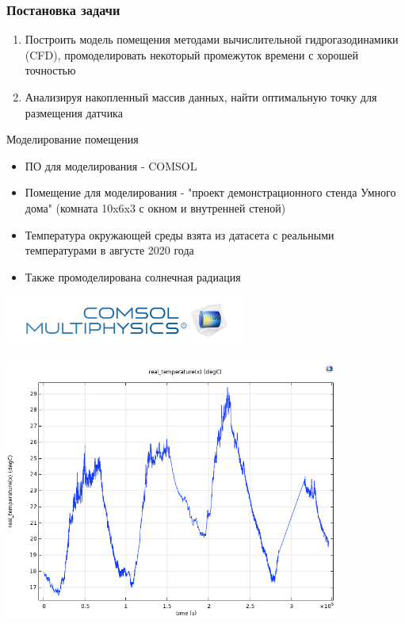 \documentclass[14pt,aspectratio=169,hyperref={pdftex,unicode},xcolor=dvipsnames]{beamer}
\begin{document}
\begin{frame}
\frametitle{Постановка задачи}
\begin{enumerate}
\item Построить модель помещения методами вычислительной гидрогазодинамики (CFD), промоделировать некоторый промежуток времени с хорошей точностью
\item Анализируя накопленный массив данных, найти оптимальную точку для размещения датчика
\end{enumerate}
\end{frame}



\begin{frame}{Моделирование помещения}
\small
\begin{itemize}
\item ПО для моделирования - COMSOL
\item Помещение для моделирования - "проект демонстрационного стенда Умного дома" (комната 10x6x3 с окном и внутренней стеной)
\item Температура окружающей среды взята из датасета с реальными температурами в августе 2020 года
\item Также промоделирована солнечная радиация
\end{itemize}

\begin{center}
\includegraphics[width=8cm]{images/logo_comsol.png}
\end{center}

\end{frame}



\begin{frame} \begin{center}
\includegraphics[width=11cm]{images/temperature_plot.png}
\end{center} \end{frame}
\end{document}

